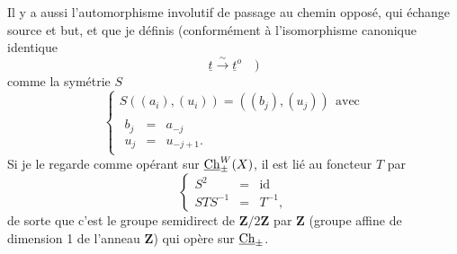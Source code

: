 Il y a aussi l'automorphisme involutif de passage au chemin opposé, qui échange source et but, et que je définis (conformément à l'isomorphisme canonique identique
\[
\underline{t} \xrightarrow{\sim} \underline{t}^o \quad )
\]
comme la symétrie $S$
\[
\left\{ \begin{array}{l}
S((a_i),(u_i)) = ((b_j),(u_j)) \ \ \text{avec} \\[1ex]
\begin{array}{lcl} b_j & = & a_{-j} \\[1ex] u_j & = & u_{-j+1}. \end{array}
\end{array} \right.
\]
Si je le regarde comme opérant sur $\underline{\mathrm{Ch}}^{W}_{\pm}(X)$, il est lié au foncteur $T$ par
\[
\left\{ \begin{array}{rcl}
S^2 & = & \mathrm{id} \\[1ex]
STS^{-1} & = & T^{-1},
\end{array} \right.
\]
de sorte que c'est le groupe semidirect de $\mathbf{Z}/2\mathbf{Z}$ par $\mathbf{Z}$ (groupe affine de dimension 1 de l'anneau $\mathbf{Z}$) qui opère sur $\underline{\mathrm{Ch}}_{\pm}$.


